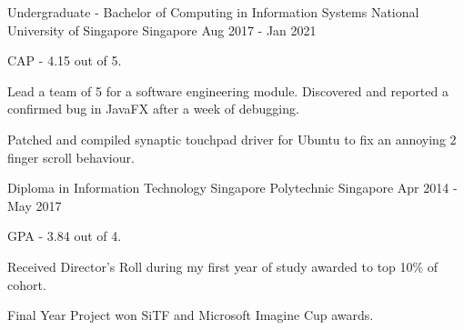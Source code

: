 

\begin{cventries}

  \cventry
    {Undergraduate - Bachelor of Computing in Information Systems} %
    {National University of Singapore} %
    {Singapore} %
    {Aug 2017 - Jan 2021} %
    {
      \begin{cvitems} %
        \item {CAP - 4.15 out of 5.}
        \item {Lead a team of 5 for a software engineering module. Discovered and reported a confirmed bug in JavaFX after a week of debugging.}
        \item {Patched and compiled synaptic touchpad driver for Ubuntu to fix an annoying 2 finger scroll behaviour.}
      \end{cvitems}
    }

  \cventry
    {Diploma in Information Technology} %
    {Singapore Polytechnic} %
    {Singapore} %
    {Apr 2014 - May 2017} %
    {
      \begin{cvitems} %
        \item {GPA - 3.84 out of 4.}
        \item {Received Director's Roll during my first year of study awarded to top 10\% of cohort.}
        \item {Final Year Project won SiTF and Microsoft Imagine Cup awards.}
      \end{cvitems}
    }

\end{cventries}
